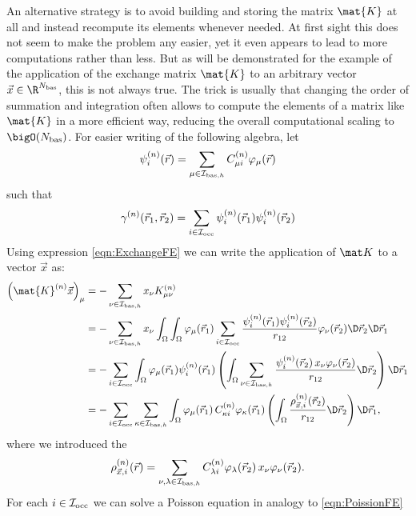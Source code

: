 An alternative strategy
is to avoid building and storing the matrix $\mat{K}$ at all
and instead recompute its elements whenever needed.
At first sight this does not seem to make the problem any easier,
yet it even appears to lead to more computations rather than less.
But as will be demonstrated for the example of the
application of the exchange matrix $\mat{K}$
to an arbitrary vector $\vec{x} \in \R^{\Nbas}$,
this is not always true.
The trick is usually that changing the order of summation and integration
often allows to compute the elements of a matrix like $\mat{K}$
in a more efficient way,
reducing the overall computational scaling to $\bigO(\Nbas)$.
For easier writing of the following algebra, let
\[ \psi_i^{(n)}(\vec{r}) = \sum_{\mu\in\mathcal{I}_{\text{bas},h}} C^{(n)}_{\mu i} \varphi_\mu(\vec{r}) \]
such that
\[
	\gamma^{(n)}(\vec{r}_1, \vec{r}_2)
	= \sum_{i\in\mathcal{I}_\text{occ}} \psi_i^{(n)}(\vec{r}_1) \psi_i^{(n)}(\vec{r}_2)
\]
Using expression \eqref{eqn:ExchangeFE} we can write
the application of $\matK$ to a vector $\vec{x}$ as:
\begin{equation}
\label{eqn:ExchangeApply}
\begin{aligned}
	\left( \mat{K}^{(n)} \vec{x}  \right)_\mu
	&= -\sum_{\nu\in\Ibash} x_\nu K^{(n)}_{\mu\nu} \\
	&= -\sum_{\nu\in\Ibash}
		x_\nu
		\int_\Omega \int_\Omega
		\varphi_\mu(\vec{r}_1)
		\sum_{i\in\Iocc}
		\frac{
			\psi_i^{(n)}(\vec{r}_1) \psi_i^{(n)}(\vec{r}_2)
		}{r_{12}}
		\varphi_\nu(\vec{r}_2) \D \vec{r}_2 \D \vec{r}_1 \\
	&= -\sum_{i\in\Iocc}
		\int_\Omega
		\varphi_\mu(\vec{r}_1) \psi_i^{(n)}(\vec{r}_1)
		\left(
		\int_\Omega
		\sum_{\nu\in\Ibash}
			\frac{\psi_i^{(n)}(\vec{r}_2) \, x_\nu \varphi_\nu(\vec{r}_2)}
			{r_{12}}
		\D \vec{r}_2
		\right) \D \vec{r}_1 \\
	&= -\sum_{i\in\Iocc} \sum_{\kappa\in\Ibash}
		\int_\Omega
			\varphi_\mu(\vec{r}_1) \, C^{(n)}_{\kappa i} \varphi_\kappa(\vec{r}_1)
		\left(
		\int_\Omega \frac{\rho_{\vec{x},i}^{(n)}(\vec{r}_2)}{r_{12}} \D \vec{r}_2
		\right) \D \vec{r}_1,
\end{aligned}
\end{equation}
where we introduced the 
\begin{equation}
	\label{eqn:ExchangeContrDens}
	\rho_{\vec{x},i}^{(n)}(\vec{r}) = \sum_{\nu,\lambda\in\mathcal{I}_{\text{bas},h}}
	C^{(n)}_{\lambda i} \varphi_\lambda(\vec{r}_2) \, x_\nu \varphi_\nu(\vec{r}_2).
\end{equation}
For each $i\in\mathcal{I}_\text{occ}$ we can solve a Poisson equation in analogy to \eqref{eqn:PoissionFE}
